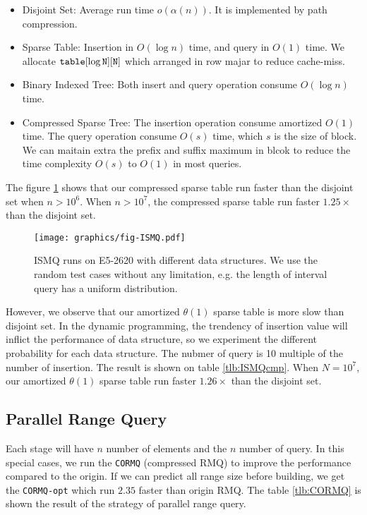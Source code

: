 \begin{itemize}
  \item 

Disjoint Set: Average run time $o(\alpha(n))$.  It is implemented by
path compression.

  \item 

Sparse Table: Insertion in $O(\log n)$ time, and query in $O(1)$ time.
We allocate $\tt{table}[\log N][N]$ which arranged in row majar to
reduce cache-miss.

  \item 

Binary Indexed Tree: Both insert and query operation consume $O(\log
n)$ time.

  \item 

Compressed Sparse Tree: The insertion operation consume amortized
$O(1)$ time.  The query operation consume $O(s)$ time, which $s$ is
the size of block.  We can maitain extra the prefix and suffix maximum
in blcok to reduce the time complexity $O(s)$ to $O(1)$ in most
queries.

\end{itemize}

The figure \ref{fig:fig-ISMQcmp} shows that our compressed sparse
table run faster than the disjoint set when $n > 10^6$.  When $n >
10^7$, the compressed sparse table run faster $1.25 \times$ than the
disjoint set.  

\begin{figure}[!thb]
  \centering
  \texttt{[image: graphics/fig-ISMQ.pdf]}
  \caption{ISMQ runs on E5-2620 with different data structures. We use the random test cases without any limitation, e.g. the length of interval query has a uniform distribution.}
  \label{fig:fig-ISMQcmp}
\end{figure}

However, we observe that our amortized $\theta(1)$ sparse table is more
slow than  disjoint set.  In the dynamic programming, the trendency of insertion value will inflict the performance of data structure, so we experiment the different probability for each data structure.  The nubmer of query is 10 multiple of the number of insertion.  The result is shown on table \ref{tlb:ISMQcmp}.  When $N=10^7$, our amortized $\theta(1)$ sparse table run faster $1.26 \times$ than the disjoint set.



\subsection{Parallel Range Query}

Each stage will have $n$ number of elements and the $n$ number of query.  In this special cases, we run the \texttt{CORMQ} (compressed RMQ) to improve the performance compared to the origin.  If we can predict all range size before building, we get the \texttt{CORMQ-opt} which run $2.35$ faster than origin RMQ.  The table \ref{tlb:CORMQ} is shown the result of the strategy of parallel range query.

